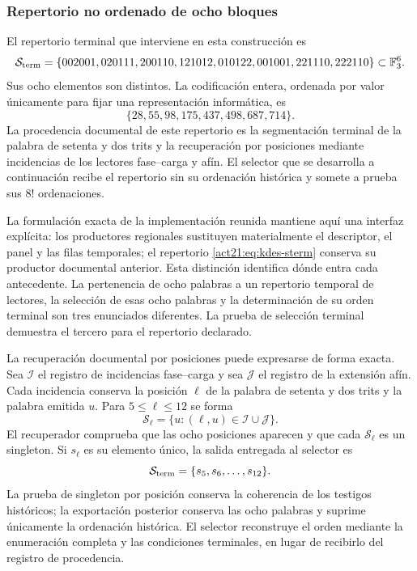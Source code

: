 \subsubsection{Repertorio no ordenado de ocho bloques}

El repertorio terminal que interviene en esta construcción es
\begin{equation}
 \mathcal S_{\rm term}=
 \{002001,020111,200110,121012,
   010122,001001,221110,222110\}\subset\mathbb F_3^6.
 \label{act21:eq:kdes-sterm}
\end{equation}
Sus ocho elementos son distintos. La codificación entera, ordenada por
valor únicamente para fijar una representación informática, es
\[
 \{28,55,98,175,437,498,687,714\}.
\]
La procedencia documental de este repertorio es la segmentación terminal
de la palabra de setenta y dos trits y la recuperación por posiciones
mediante incidencias de los lectores fase--carga y afín. El selector que
se desarrolla a continuación recibe el repertorio sin su ordenación
histórica y somete a prueba sus $8!$ ordenaciones.

La formulación exacta de la implementación reunida mantiene aquí una
interfaz explícita: los productores regionales sustituyen materialmente
el descriptor, el panel y las filas temporales; el repertorio
\eqref{act21:eq:kdes-sterm} conserva su productor documental anterior. Esta
distinción identifica dónde entra cada antecedente. La pertenencia de
ocho palabras a un repertorio temporal de lectores, la selección de esas
ocho palabras y la determinación de su orden terminal son tres
enunciados diferentes. La prueba de selección terminal demuestra el
tercero para el repertorio declarado.

La recuperación documental por posiciones puede expresarse de forma
exacta. Sea $\mathcal I$ el registro de incidencias fase--carga y sea
$\mathcal J$ el registro de la extensión afín. Cada incidencia conserva
la posición $\ell$ de la palabra de setenta y dos trits y la palabra
emitida $u$. Para $5\leq\ell\leq12$ se forma
\[
 \mathcal S_\ell=
 \{u:(\ell,u)\in\mathcal I\cup\mathcal J\}.
\]
El recuperador comprueba que las ocho posiciones aparecen y que cada
$\mathcal S_\ell$ es un singleton. Si $s_\ell$ es su elemento único,
la salida entregada al selector es
\[
 \mathcal S_{\rm term}=\{s_5,s_6,\ldots,s_{12}\}.
\]
La prueba de singleton por posición conserva la coherencia de los
testigos históricos; la exportación posterior conserva las ocho
palabras y suprime únicamente la ordenación histórica. El selector
reconstruye el orden mediante la enumeración completa y las condiciones
terminales, en lugar de recibirlo del registro de procedencia.


